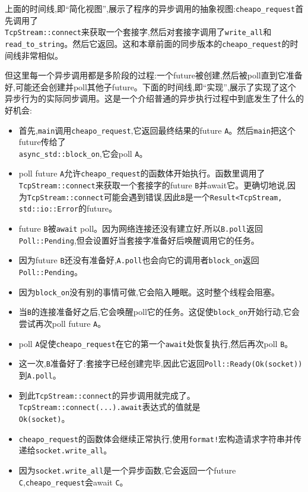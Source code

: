 上面的时间线,即“简化视图”,展示了程序的异步调用的抽象视图:\texttt{cheapo\_request}首先调用了\\
\texttt{TcpStream::connect}来获取一个套接字,然后对套接字调用了\texttt{write\_all}和\texttt{read\_to\_string}。然后它返回。这和本章前面的同步版本的\texttt{cheapo\_request}的时间线非常相似。

但这里每一个异步调用都是多阶段的过程:一个future被创建,然后被poll直到它准备好,可能还会创建并poll其他子future。下面的时间线,即“实现”,展示了实现了这个异步行为的实际同步调用。这是一个介绍普通的异步执行过程中到底发生了什么的好机会:
\begin{itemize}
    \item 首先,\texttt{main}调用\texttt{cheapo\_request},它返回最终结果的future \texttt{A}。然后\texttt{main}把这个future传给了\\
    \texttt{async\_std::block\_on},它会poll \texttt{A}。
    \item poll future \texttt{A}允许\texttt{cheapo\_request}的函数体开始执行。函数里调用了\texttt{TcpStream::connect}来获取一个套接字的future \texttt{B}并await它。更确切地说,因为\texttt{TcpStream::connect}可能会遇到错误,因此\texttt{B}是一个\texttt{Result<TcpStream, std::io::Error}的future。
    \item future \texttt{B}被\texttt{await} poll。因为网络连接还没有建立好,所以\texttt{B.poll}返回\texttt{Poll::Pending},但会设置好当套接字准备好后唤醒调用它的任务。
    \item 因为future \texttt{B}还没有准备好,\texttt{A.poll}也会向它的调用者\texttt{block\_on}返回\texttt{Poll::Pending}。
    \item 因为\texttt{block\_on}没有别的事情可做,它会陷入睡眠。这时整个线程会阻塞。
    \item 当\texttt{B}的连接准备好之后,它会唤醒poll它的任务。这促使\texttt{block\_on}开始行动,它会尝试再次poll future \texttt{A}。
    \item poll \texttt{A}促使\texttt{cheapo\_request}在它的第一个\texttt{await}处恢复执行,然后再次poll \texttt{B}。
    \item 这一次,\texttt{B}准备好了:套接字已经创建完毕,因此它返回\texttt{Poll::Ready(Ok(socket))}到\texttt{A.poll}。
    \item 到此\texttt{TcpStream::connect}的异步调用就完成了。\texttt{TcpStream::connect(...).await}表达式的值就是\\
    \texttt{Ok(socket)}。
    \item \texttt{cheapo\_request}的函数体会继续正常执行,使用\texttt{format!}宏构造请求字符串并传递给\texttt{socket.write\_all}。
    \item 因为\texttt{socket.write\_all}是一个异步函数,它会返回一个future \texttt{C},\texttt{cheapo\_request}会await \texttt{C}。
\end{itemize}

